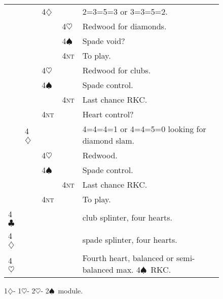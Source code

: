 \documentclass{report}
\renewcommand{\c}{\ensuremath{\clubsuit}}
\renewcommand{\d}{\ensuremath{\diamondsuit}}
\newcommand{\h}{\ensuremath{\heartsuit}}
\newcommand{\s}{\ensuremath{\spadesuit}}
\newcommand{\nt}{\textsc{nt}}
\newcommand{\+}{\ensuremath{^+}}
\begin{document}
\begin{figure}[ht]
\begin{tabular}{ll|ll|l}
 & & 4\d & & 2=3=5=3 or 3=3=5=2. \\
 & & & 4\h & Redwood for diamonds. \\
 & & & 4\s & Spade void? \\
 & & & 4\nt & To play. \\
 & & 4\h & & Redwood for clubs. \\
 & & 4\s & & Spade control. \\
 & & & 4\nt & Last chance RKC. \\
 & & 4\nt & & Heart control? \\
 & 4\d & & & 4=4=4=1 or 4=4=5=0 looking for diamond slam.\\
 & & 4\h & & Redwood. \\
 & & 4\s & & Spade control. \\
 & & & 4\nt & Last chance RKC. \\
 & & 4\nt & & To play.\\
 4\c & & & & club splinter, four hearts. \\
 4\d & & & & spade splinter, four hearts. \\
 4\h & & & & Fourth heart, balanced or semi-balanced max. 4\s\ RKC. \\
\end{tabular}
\caption{1\d - 1\h - 2\h - 2\s\ module.}
\end{figure}
\end{document}
